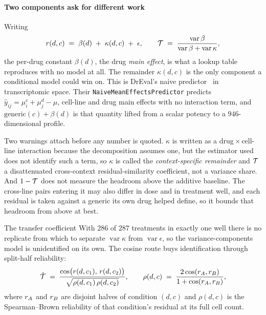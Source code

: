 \paragraph{Two components ask for different work} Writing
\begin{equation}
 r(d,c) \;=\; \beta(d) \;+\; \kappa(d,c) \;+\; \epsilon,
 \qquad
 \mathcal{T} \;=\; \frac{\operatorname{var}\beta}{\operatorname{var}\beta + \operatorname{var}\kappa},
\end{equation}
the per-drug constant $\beta(d)$, the drug \emph{main effect}, is what a lookup
table reproduces with no model at all. The remainder $\kappa(d,c)$ is the only component a
conditional model could win on. This is DrEval's naive predictor~\cite{dreval} in
transcriptomic space. Their \texttt{NaiveMeanEffectsPredictor} predicts
$\hat{y}_{ij} = \mu^c_i + \mu^d_j - \mu$, cell-line and drug main effects with no
interaction term, and $\textrm{generic}(c) + \beta(d)$ is that quantity lifted
from a scalar potency to a $946$-dimensional profile.

Two warnings attach before any number is quoted. $\kappa$ is written as a
drug\,$\times$\,cell-line interaction because the decomposition assumes one, but
the estimator used does not identify such a term, so $\kappa$ is called the
\emph{context-specific remainder} and $\mathcal{T}$ a disattenuated cross-context
residual-similarity coefficient, not a variance share. And $1 - \mathcal{T}$ does not
measure the headroom above the additive baseline. The cross-line pairs entering
it may also differ in dose and in treatment well, and each residual is taken
against a generic its own drug helped define, so it bounds that headroom from
above at best.

\begin{defn}{The transfer coefficient}
With $\num{286}$ of $\num{287}$ treatments in exactly one well there is
no replicate from which to separate $\operatorname{var}\kappa$ from
$\operatorname{var}\epsilon$, so the variance-components model is unidentified on
its own. The cosine route buys identification through split-half reliability:
\begin{equation}
 \hat{\mathcal{T}} \;=\; \frac{\cos\!\big(r(d,c_1),\, r(d,c_2)\big)}
 {\sqrt{\rho(d,c_1)\,\rho(d,c_2)}},
 \qquad
 \rho(d,c) \;=\; \frac{2\cos(r_A, r_B)}{1 + \cos(r_A, r_B)},
\end{equation}
where $r_A$ and $r_B$ are disjoint halves of condition $(d,c)$ and
$\rho(d,c)$ is the Spearman--Brown reliability of that condition's residual at
its full cell count.
\end{defn}

